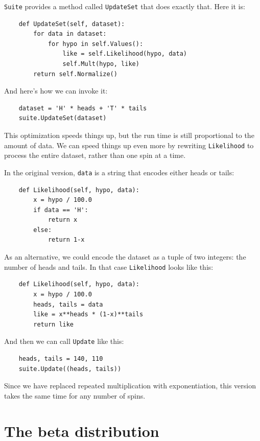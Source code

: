 \documentclass[12pt]{book}
\begin{document}
\verb"Suite" provides a method called \verb"UpdateSet" that does
exactly that.  Here it is:

\begin{verbatim}
    def UpdateSet(self, dataset):
        for data in dataset:
            for hypo in self.Values():
                like = self.Likelihood(hypo, data)
                self.Mult(hypo, like)
        return self.Normalize()
\end{verbatim}

And here's how we can invoke it:

\begin{verbatim}
    dataset = 'H' * heads + 'T' * tails
    suite.UpdateSet(dataset)
\end{verbatim}

This optimization speeds things up, but the run time is still
proportional to the amount of data.  We can speed things up
even more by rewriting \verb"Likelihood" to process the entire
dataset, rather than one spin at a time.

In the original version,
\verb"data" is a string that encodes either heads or tails:

\begin{verbatim}
    def Likelihood(self, hypo, data):
        x = hypo / 100.0
        if data == 'H':
            return x
        else:
            return 1-x
\end{verbatim}

As an alternative, we could encode the dataset as a tuple of 
two integers: the number of heads and tails.
In that case \verb"Likelihood" looks like this:

\begin{verbatim}
    def Likelihood(self, hypo, data):
        x = hypo / 100.0
        heads, tails = data
        like = x**heads * (1-x)**tails
        return like
\end{verbatim}

And then we can call \verb"Update" like this:

\begin{verbatim}
    heads, tails = 140, 110
    suite.Update((heads, tails))
\end{verbatim}

Since we have replaced repeated multiplication with exponentiation,
this version takes the same time for any number of spins.


\section{The beta distribution}
\label{beta}
\end{document}

